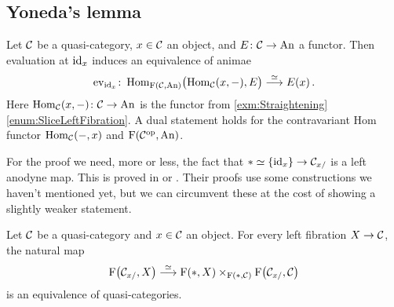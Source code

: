 \subsection{Yoneda's lemma}\label{subsec:Yoneda}
\begin{thm}\label{thm:Yoneda}
	Let $\mathcal{C}$ be a quasi-category, $x\in \mathcal{C}$ an object, and $E\colon \mathcal{C}\rightarrow \mathrm{An}$ a functor. Then evaluation at $\operatorname{id}_x$ induces an equivalence of animae
	\begin{equation*}
		\ev_{\id_x}\colon \Hom_{\F(\Cc,\cat{An})}\lef(\Hom_\Cc(x,-),E\righ)\overset{\simeq}{\longrightarrow} E(x)\,.
	\end{equation*}
	Here $\operatorname{Hom}_{\mathcal{C}}(x,-)\colon \mathcal{C}\rightarrow \mathrm{An}$ is the functor from \cref{exm:Straightening}\cref{enum:SliceLeftFibration}. A dual statement holds for the contravariant Hom functor $\operatorname{Hom}_{\mathcal{C}}(-,x)$ and $\operatorname{F}(\mathcal{C}^{\mathrm{op}},\mathrm{An})$.
\end{thm}
For the proof we need, more or less, the fact that $*\simeq \{\operatorname{id}_x\}\rightarrow \mathcal{C}_{x/}$ is a left anodyne map. This is proved in \cite[Lemma~4.1.4]{Land} or \cite[Corollary~D.7]{HigherCatsII}. Their proofs use some constructions we haven't mentioned yet, but we can circumvent these at the cost of showing a slightly weaker statement.
\begin{lem}\label{lem:WeaklyLeftAnodyne}
	Let $\mathcal{C}$ be a quasi-category and $x\in\mathcal{C}$ an object. For every left fibration $X\rightarrow \mathcal{C}$, the natural map
	\begin{equation*}
		\operatorname{F}\bigl(\mathcal{C}_{x/},X\bigr)\overset{\simeq}{\longrightarrow}\operatorname{F}\!\left(*,X\right)\times_{\operatorname{F}\left(*,\mathcal{C}\right)}\operatorname{F}\bigl(\mathcal{C}_{x/},\mathcal{C}\bigr)
	\end{equation*}
	is an equivalence of quasi-categories.
\end{lem}
